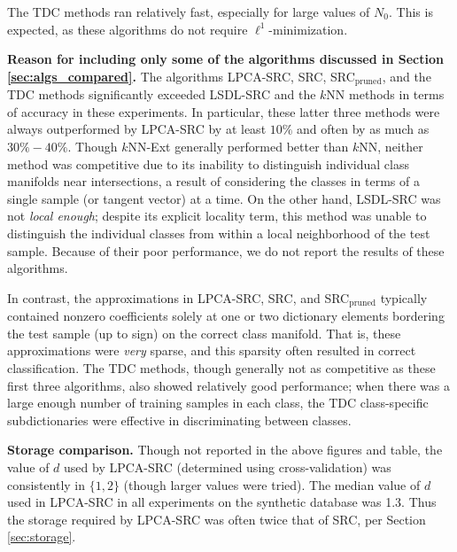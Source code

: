 \documentclass[review]{elsarticle}
\begin{document}
The TDC methods ran relatively fast, especially for large values of $N_0$. This is expected, as these algorithms do not require $\ell^1$-minimization. 

\textbf{Reason for including only some of the algorithms discussed in Section \ref{sec:algs_compared}.} The algorithms LPCA-SRC, SRC, SRC$_\mathrm{pruned}$, and the TDC methods significantly exceeded LSDL-SRC and the $k$NN methods in terms of accuracy in these experiments. In particular, these latter three methods were always outperformed by LPCA-SRC by at least $10\%$ and often by as much as $30\%-40\%$. Though $k$NN-Ext generally performed better than $k$NN, neither method was competitive due to its inability to distinguish individual class manifolds near intersections, a result of considering the classes in terms of a single sample (or tangent vector) at a time. On the other hand, LSDL-SRC was not \emph{local enough}; despite its explicit locality term, this method was unable to distinguish the individual classes from within a local neighborhood of the test sample. Because of their poor performance, we do not report the results of these algorithms. 

In contrast, the approximations in LPCA-SRC, SRC, and SRC$_\mathrm{pruned}$ typically contained nonzero coefficients solely at one or two dictionary elements bordering the test sample (up to sign) on the correct class manifold. That is, these approximations were \emph{very} sparse, and this sparsity often resulted in correct classification. The TDC methods, though generally not as competitive as these first three algorithms, also showed relatively good performance; when there was a large enough number of training samples in each class, the TDC class-specific subdictionaries were effective in discriminating between classes.


\textbf{Storage comparison.} Though not reported in the above figures and table, the value of $d$ used by LPCA-SRC (determined using cross-validation) was consistently in $\{1,2\}$ (though larger values were tried). The median value of $d$ used in LPCA-SRC in all experiments on the synthetic database was 1.3. Thus the storage required by LPCA-SRC was often twice that of SRC, per Section \ref{sec:storage}. 
\end{document}
